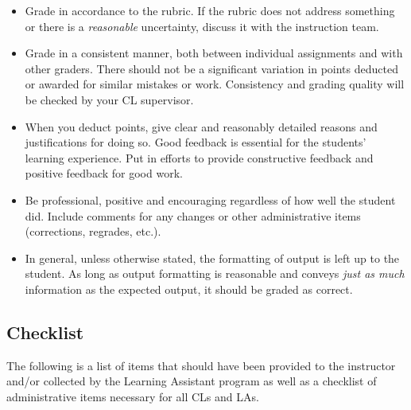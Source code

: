 \documentclass[12pt]{scrartcl}
\begin{document}
\begin{itemize}
  \item Grade in accordance to the rubric.  If the rubric 
    does not address something or there is a \emph{reasonable} uncertainty, 
    discuss it with the instruction team.
  \item Grade in a consistent manner, both between individual assignments and
    with other graders.  There should not be a significant variation in
    points deducted or awarded for similar mistakes or work.  Consistency 
    and grading quality will be checked by your CL supervisor.
  \item When you deduct points, give clear and reasonably detailed reasons
    and justifications for doing so.  Good feedback is essential for the
    students' learning experience.  Put in efforts to provide constructive
    feedback and positive feedback for good work.
  \item Be professional, positive and encouraging regardless of how well 
    the student did.  Include comments for any changes or other administrative 
    items (corrections, regrades, etc.).
  \item In general, unless otherwise stated, the formatting of output is
    left up to the student.  As long as output formatting is reasonable and
    conveys \emph{just as much} information as the expected output, it should
    be graded as correct.
\end{itemize}

\subsection*{Checklist}

The following is a list of items that should have been provided to 
the instructor and/or collected by the Learning Assistant program
as well as a checklist of administrative items necessary for all
CLs and LAs.
\end{document}
